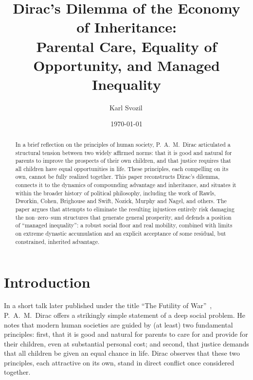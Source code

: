 \documentclass[%
  reprint,
  superscriptaddress,
  amsmath,amssymb,
  pra,
  floatfix,
  longbibliography
]{revtex4-2}
\begin{document}
\title{Dirac's Dilemma of the Economy of Inheritance:\\
Parental Care, Equality of Opportunity, and Managed Inequality}


\author{Karl Svozil\,}


\date{\today}

\begin{abstract}
In a brief reflection on the principles of human society, P.~A.~M.~Dirac
articulated a structural tension between two widely affirmed norms:
that it is good and natural for parents to improve the prospects of their own
children, and that justice requires that all children have equal
opportunities in life.  These principles, each compelling on its own,
cannot be fully realized together.  This paper reconstructs Dirac's
dilemma, connects it to the dynamics of compounding advantage and
inheritance, and situates it within the broader history of political
philosophy, including the work of Rawls, Dworkin, Cohen, Brighouse and
Swift, Nozick, Murphy and Nagel, and others.  The paper argues that
attempts to eliminate the resulting injustices entirely risk damaging
the non--zero--sum structures that generate general prosperity, and
defends a position of ``managed inequality'': a robust social floor and
real mobility, combined with limits on extreme dynastic accumulation and
an explicit acceptance of some residual, but constrained, inherited
advantage.
\end{abstract}

\maketitle

\section{Introduction}

In a short talk later published under the title
``The Futility of War''~\cite{dirac-81},
P.~A.~M.~Dirac offers a strikingly simple statement of a deep social
problem.  He notes that modern human societies are guided by (at least)
two fundamental principles:
first, that it is good and natural for parents to care for and provide
for their children, even at substantial personal cost; and second, that
justice demands that all children be given an equal chance in life.
Dirac observes that these two principles, each attractive on its own,
stand in direct conflict once considered together.
\end{document}
